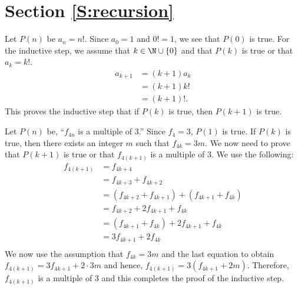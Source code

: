 \section*{Section \ref{S:recursion}}
\begin{list}{\bf{\ref{exer:sec51-factorial}.}}
\item  Let $P(n)$ be $a_n = n!$.  Since $a_0 = 1$ and $0 ! = 1$, we see that $P(0)$ is true.  For the inductive step, we assume that $k \in \N \cup \{0\}$ and that $P(k)$ is true or that  $a_k = k!$.
\begin{align*}
a_{k+1} &= \left( k + 1 \right)a_k \\
        &= \left( k + 1 \right) k! \\
        &= \left( k + 1 \right)!. 
\end{align*}
This proves the inductive step that  if $P(k)$ is true, then $P(k+1)$ is true.
\end{list}




\begin{list}{\bf{\ref{exer:sec53-fib}.}}
\item \begin{list}{\bf{(a)}}
\item Let $P( n )$ be, ``$f_{4n}$ is a multiple of 3.''  Since $f_4 = 3$, 
$P( 1 )$ is true.  If $P( k )$ is true, then there exists an integer $m$ such that $f_{4k} = 3m$.  We now need to prove that $P(k+1)$ is true or that $f_{4(k+1)}$ is a multiple of 3.  We use the following:
\begin{align*}
f_{4 \left( k + 1 \right)} &= f_{4k + 4} \\
                           &= f_{4k+3} + f_{4k+2} \\
                 &= \left( f_{4k+2} + f_{4k+1} \right) + \left( f_{4k+1} + f_{4k} \right) \\
                 &= f_{4k+2} + 2 f_{4k+1} + f_{4k} \\
                 &= \left( f_{4k+1} + f_{4k} \right) + 2 f_{4k+1} + f_{4k} \\
                 &= 3f_{4k + 1} + 2f_{4k} \\
\end{align*}
We now use the assumption that $f_{4k} = 3m$ and the last equation to obtain $f_{4(k+1)} = 3f_{4k + 1} + 2\cdot 3m$ and hence,
$f_{4(k+1)} = 3 \left( f_{4k +1} + 2m \right)$.  Therefore, $f_{4(k+1)}$ is a multiple of 3 and this completes the proof of the inductive step.
\end{list}
\end{list}



